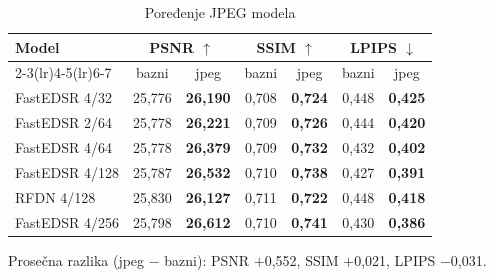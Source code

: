 \begin{table}[H]
    \begin{tabular}{lcccccc}
        \toprule
        Model & \multicolumn{2}{c}{PSNR $\uparrow$} & \multicolumn{2}{c}{SSIM $\uparrow$} & \multicolumn{2}{c}{LPIPS $\downarrow$} \\
        \cmidrule(lr){2-3}\cmidrule(lr){4-5}\cmidrule(lr){6-7}
         & bazni & jpeg & bazni & jpeg & bazni & jpeg \\
        \midrule
        FastEDSR 4/32 & 25,776 & \textbf{26,190} & 0,708 & \textbf{0,724} & 0,448 & \textbf{0,425} \\
        FastEDSR 2/64 & 25,778 & \textbf{26,221} & 0,709 & \textbf{0,726} & 0,444 & \textbf{0,420} \\
        FastEDSR 4/64 & 25,778 & \textbf{26,379} & 0,709 & \textbf{0,732} & 0,432 & \textbf{0,402} \\
        FastEDSR 4/128 & 25,787 & \textbf{26,532} & 0,710 & \textbf{0,738} & 0,427 & \textbf{0,391} \\
        RFDN 4/128 & 25,830 & \textbf{26,127} & 0,711 & \textbf{0,722} & 0,448 & \textbf{0,418} \\
        FastEDSR 4/256 & 25,798 & \textbf{26,612} & 0,710 & \textbf{0,741} & 0,430 & \textbf{0,386} \\
        \bottomrule
    \end{tabular}
    \caption{Poređenje JPEG modela}
    \label{tab:jpeg_4x_DIV2K_jpeg80}
\end{table}

\noindent Prosečna razlika (jpeg $-$ bazni): PSNR $+$0,552, SSIM $+$0,021, LPIPS $-$0,031.